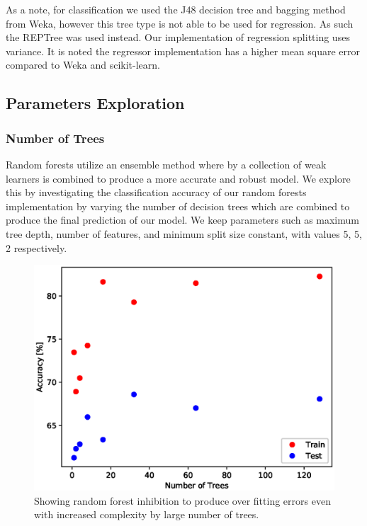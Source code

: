 \documentclass{article} %
\begin{document}
As a note, for classification we used the J48 decision tree and bagging method from Weka, however this tree type is not able to be used for regression. As such the REPTree was used instead. Our implementation of regression splitting uses variance.\cite{Brieman84} It is noted the regressor implementation has a higher mean square error compared to Weka and scikit-learn.

\subsection{Parameters Exploration}

\subsubsection{Number of Trees}

Random forests utilize an ensemble method where by a collection of weak learners is combined to produce a more accurate and robust model. We explore this by investigating the classification accuracy of our random forests implementation by varying the number of decision trees which are combined to produce the final prediction of our model. We keep parameters such as maximum tree depth, number of features, and minimum split size constant, with values 5, 5, 2 respectively.

\begin{figure}[ht]
\begin{center}
\includegraphics[scale=0.4]{n_trees}
\end{center}
\caption{Showing random forest inhibition to produce over fitting errors even with increased complexity by large number of trees.}
\label{fig:n_trees}
\end{figure}
\end{document}
